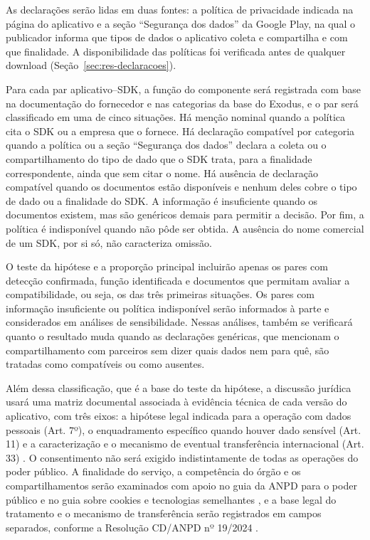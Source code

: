 \label{sec:declaracoes}

As declarações serão lidas em duas fontes: a política de privacidade indicada na página do aplicativo e a seção ``Segurança dos dados'' da Google Play, na qual o publicador informa que tipos de dados o aplicativo coleta e compartilha e com que finalidade. A disponibilidade das políticas foi verificada antes de qualquer download (Seção~\ref{sec:res-declaracoes}).

Para cada par aplicativo--SDK, a função do componente será registrada com base na documentação do fornecedor e nas categorias da base do Exodus, e o par será classificado em uma de cinco situações. Há menção nominal quando a política cita o SDK ou a empresa que o fornece. Há declaração compatível por categoria quando a política ou a seção ``Segurança dos dados'' declara a coleta ou o compartilhamento do tipo de dado que o SDK trata, para a finalidade correspondente, ainda que sem citar o nome. Há ausência de declaração compatível quando os documentos estão disponíveis e nenhum deles cobre o tipo de dado ou a finalidade do SDK. A informação é insuficiente quando os documentos existem, mas são genéricos demais para permitir a decisão. Por fim, a política é indisponível quando não pôde ser obtida. A ausência do nome comercial de um SDK, por si só, não caracteriza omissão.

O teste da hipótese e a proporção principal incluirão apenas os pares com detecção confirmada, função identificada e documentos que permitam avaliar a compatibilidade, ou seja, os das três primeiras situações. Os pares com informação insuficiente ou política indisponível serão informados à parte e considerados em análises de sensibilidade. Nessas análises, também se verificará quanto o resultado muda quando as declarações genéricas, que mencionam o compartilhamento com parceiros sem dizer quais dados nem para quê, são tratadas como compatíveis ou como ausentes.

Além dessa classificação, que é a base do teste da hipótese, a discussão jurídica usará uma matriz documental associada à evidência técnica de cada versão do aplicativo, com três eixos: a hipótese legal indicada para a operação com dados pessoais (Art. 7º), o enquadramento específico quando houver dado sensível (Art. 11) e a caracterização e o mecanismo de eventual transferência internacional (Art. 33) \cite{brasil2018}. O consentimento não será exigido indistintamente de todas as operações do poder público. A finalidade do serviço, a competência do órgão e os compartilhamentos serão examinados com apoio no guia da ANPD para o poder público \cite{anpd2023} e no guia sobre cookies e tecnologias semelhantes \cite{anpd2022}, e a base legal do tratamento e o mecanismo de transferência serão registrados em campos separados, conforme a Resolução CD/ANPD nº 19/2024 \cite{anpd2024}.

